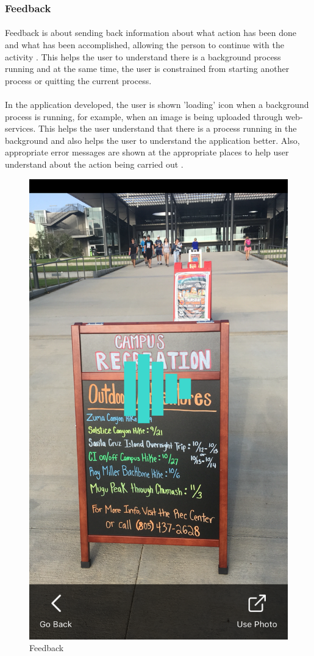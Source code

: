 \documentclass[12pt]{article}
\begin{document}
        \subsubsection{Feedback}
       \paragraph{}Feedback is about sending back information about what action has been done and what has been accomplished, allowing the person to continue with the activity \cite{norman}. This helps the user to understand there is a background process running and at the same time, the user is constrained from starting another process or quitting the current process. 
       
       \paragraph{}In the application developed, the user is shown 'loading' icon when a background process is running, for example, when an image is being uploaded through web-services. This helps the user understand that there is a process running in the background and also helps the user to understand the application better. Also, appropriate error messages are shown at the appropriate places to help user understand about the action being carried out \cite{norman}.
       
       \begin{figure}[H]
	\centering
	\includegraphics[width=0.5\linewidth]{media/loading1.PNG}
	\caption{Feedback}
	\label{fig:feedback}
\end{figure} 
\end{document}
